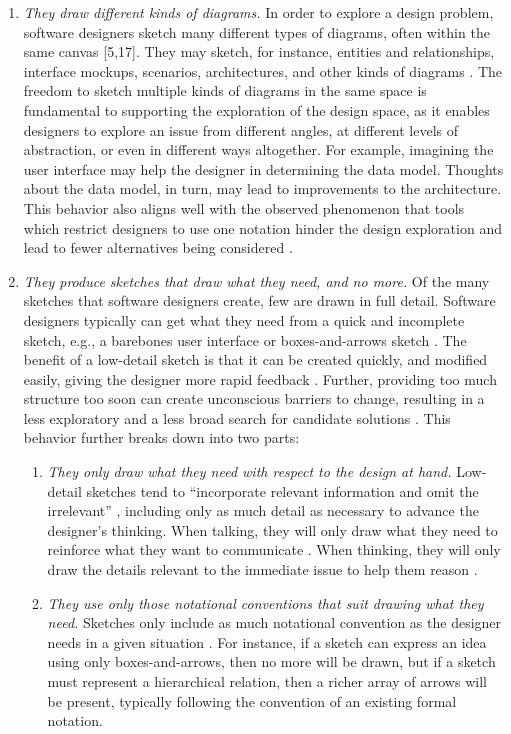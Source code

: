\begin{enumerate}
\item \emph{They draw different kinds of diagrams.} In order to explore a design problem, software designers sketch many different types of diagrams, often within the same canvas [5,17]. They may sketch, for instance, entities and relationships, interface mockups, scenarios, architectures, and other kinds of diagrams \cite{cherubini2007let}. The freedom to sketch multiple kinds of diagrams in the same space is fundamental to supporting the exploration of the design space, as it enables designers to explore an issue from different angles, at different levels of abstraction, or even in different ways altogether. For example, imagining the user interface may help the designer in determining the data model. Thoughts about the data model, in turn, may lead to improvements to the architecture. This behavior also aligns well with the observed phenomenon that tools which restrict designers to use one notation hinder the design exploration and lead to fewer alternatives being considered \cite{shipman1999incremental}. 

\item \emph{They produce sketches that draw what they need, and no more.} Of the many sketches that software designers create, few are drawn in full detail. Software designers typically can get what they need from a quick and incomplete sketch, e.g., a barebones user interface or boxes-and-arrows sketch \cite{virzi1996usability}. The benefit of a low-detail sketch is that it can be created quickly, and modified easily, giving the designer more rapid feedback \cite{cherubini2007let,petre2009insights}. Further, providing too much structure too soon can create unconscious barriers to change, resulting in a less exploratory and a less broad search for candidate solutions \citep{wong1992rough}. This behavior further breaks down into two parts:
 \begin{enumerate}
 \item \emph{They only draw what they need with respect to the design at hand.} Low-detail sketches tend to “incorporate relevant information and omit the irrelevant” \cite{tversky2002sketches}, including only as much detail as necessary to advance the designer’s thinking. When talking, they will only draw what they need to reinforce what they want to communicate \cite{petre2009insights}. When thinking, they will only draw the details relevant to the immediate issue to help them reason \citep{dekel2007notation}.
 \item \emph{They use only those notational conventions that suit drawing what they need.} Sketches only include as much notational convention as the designer needs in a given situation \cite{petre2009insights}. For instance, if a sketch can express an idea using only boxes-and-arrows, then no more will be drawn, but if a sketch must represent a hierarchical relation, then a richer array of arrows will be present, typically following the convention of an existing formal notation.
 \end{enumerate}


\end{enumerate}

